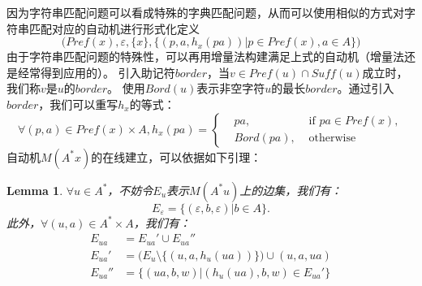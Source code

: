\documentclass[UTF8]{ctexart}
\newtheorem{lem}[thm]{Lemma}
\theoremstyle{definition}
\theoremstyle{remark}
\numberwithin{equation}{subsection}
\newcommand{\resetcounter}{\setcounter{equation}{0}}
\begin{document}
	因为字符串匹配问题可以看成特殊的字典匹配问题，从而可以使用相似的方式对字符串匹配对应的自动机进行形式化定义
	\[
		\Big( Pref(x), \varepsilon, \{x\}, \{(p, a, h_x(pa)) | p \in Pref(x), a \in A \} \Big)
	\]
	由于字符串匹配问题的特殊性，可以再用增量法构建满足上式的自动机（增量法还是经常得到应用的）。
	引入助记符$border$，当$v \in Pref(u) \cap Suff(u)$成立时，我们称$v$是$u$的$border$。
	使用$Bord(u)$表示非空字符$u$的最长$border$。通过引入$border$，我们可以重写$h_x$的等式：
	\[
		\forall (p,a) \in Pref(x) \times A, h_x(pa) =
		\left\{
			\begin{aligned}
				&pa, 		&\text{ if } pa \in Pref(x),	\\
				&Bord(pa),	&\text{ otherwise }
			\end{aligned}
		\right .
	\]
	自动机$M(A^*x)$的在线建立，可以依据如下引理：
	\begin{lem}
		$\forall u \in A^*$，不妨令$E_u$表示$M(A^*u)$上的边集，我们有：
		\[
			E_\varepsilon = \{ (\varepsilon, b, \varepsilon) | b \in A \}.
		\]
		此外，$\forall (u,a) \in A^* \times A$，我们有：
		\resetcounter
		\begin{align}
			E_{ua} 	&= E_{ua}' \cup E_{ua}''		\\
			E_{ua}' &= \big( E_u \setminus \{(u,a,h_u(ua))\} \big) \cup {(u, a, ua)}	\\
			E_{ua}''&= \{ (ua,b,w) | (h_u(ua), b, w) \in E_{ua}' \}
		\end{align}
	\end{lem}
\end{document}
